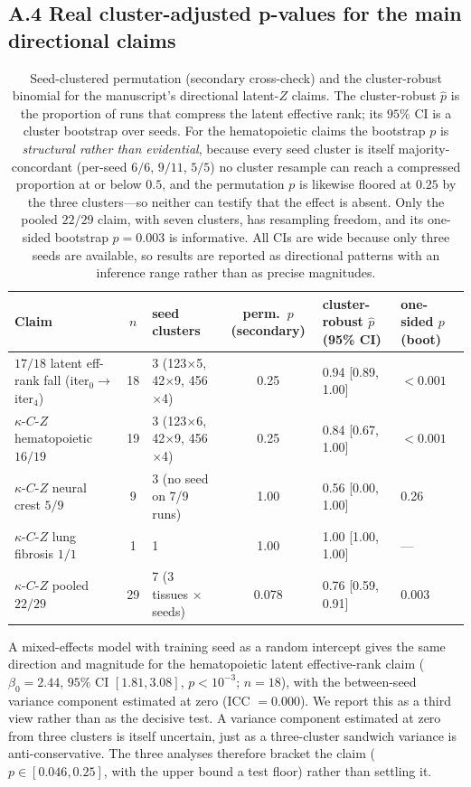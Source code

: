 \documentclass[11 pt,a4 paper]{article}
\begin{document}
\subsection*{A.4 Real cluster-adjusted p-values for the main directional claims}
\begin{table}[h]
\centering
\footnotesize
\begin{tabular}{@{}p{4.4cm}cp{1.7cm}cp{2.5cm}p{1.9cm}@{}}
\toprule
Claim & $n$ & seed clusters & perm.\ $p$ (secondary) & cluster-robust $\hat p$ (95\% CI) & one-sided $p$ (boot) \\
\midrule
$17/18$ latent eff-rank fall (iter$_0\!\to\!$iter$_4$) & 18 & 3 (123$\times$5, 42$\times$9, 456$\times$4) & 0.25 & 0.94 [0.89, 1.00] & $<0.001$ \\
$\kappa$-$C$-$Z$ hematopoietic $16/19$ & 19 & 3 (123$\times$6, 42$\times$9, 456$\times$4) & 0.25 & 0.84 [0.67, 1.00] & $<0.001$ \\
$\kappa$-$C$-$Z$ neural crest $5/9$ & 9 & 3 (no seed on 7/9 runs) & 1.00 & 0.56 [0.00, 1.00] & 0.26 \\
$\kappa$-$C$-$Z$ lung fibrosis $1/1$ & 1 & 1 & 1.00 & 1.00 [1.00, 1.00] & --- \\
$\kappa$-$C$-$Z$ pooled $22/29$ & 29 & 7 (3 tissues $\times$ seeds) & 0.078 & 0.76 [0.59, 0.91] & 0.003 \\
\bottomrule
\end{tabular}
\caption{Seed-clustered permutation (secondary cross-check) and the cluster-robust
binomial for the manuscript's directional latent-$Z$ claims. The cluster-robust
$\hat p$ is the proportion of runs that compress the latent effective rank; its
$95\%$ CI is a cluster bootstrap over seeds. For the hematopoietic claims the
bootstrap $p$ is \emph{structural rather than evidential}, because every seed
cluster is itself majority-concordant (per-seed $6/6$, $9/11$, $5/5$) no
cluster resample can reach a compressed proportion at or below $0.5$, and the
permutation $p$ is likewise floored at $0.25$ by the three clusters---so neither
can testify that the effect is absent. Only the pooled $22/29$ claim, with seven
clusters, has resampling freedom, and its one-sided bootstrap $p=0.003$ is
informative. All CIs are wide because only three seeds are available, so results
are reported as directional patterns with an inference range rather than as
precise magnitudes.}
\label{tab:clust}
\end{table}

\noindent A mixed-effects model with training seed as a random intercept gives the
same direction and magnitude for the hematopoietic latent effective-rank claim
($\beta_0=2.44$, $95\%$ CI $[1.81,3.08]$, $p<10^{-3}$; $n=18$), with the
between-seed variance component estimated at zero (ICC $=0.000$). We report this
as a third view rather than as the decisive test. A variance component estimated
at zero from three clusters is itself uncertain, just as a three-cluster sandwich
variance is anti-conservative. The three analyses therefore bracket the claim
($p\in[0.046,0.25]$, with the upper bound a test floor) rather than settling it.
\end{document}
